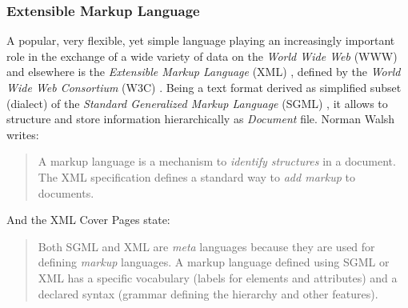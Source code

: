 %
%
%
%
%
%
%

\subsubsection{Extensible Markup Language}
\label{extensible_markup_language_heading}

A popular, very flexible, yet simple language playing an increasingly important
role in the exchange of a wide variety of data on the \emph{World Wide Web}
(WWW) and elsewhere is the \emph{Extensible Markup Language} (XML) \cite{xml},
defined by the \emph{World Wide Web Consortium} (W3C) \cite{w3c}. Being a text
format derived as simplified subset (dialect) of the
\emph{Standard Generalized Markup Language} (SGML) \cite{sgml}, it allows to
structure and store information hierarchically as \emph{Document} file. Norman
Walsh \cite{walsh} writes:

\begin{quote}
    A markup language is a mechanism to \emph{identify structures} in a document.
    The XML specification defines a standard way to \emph{add markup} to documents.
\end{quote}

And the XML Cover Pages \cite{sgmlmetamarkup} state:

\begin{quote}
    Both SGML and XML are \emph{meta} languages because they are used for
    defining \emph{markup} languages. A markup language defined using SGML or
    XML has a specific vocabulary (labels for elements and attributes) and a
    declared syntax (grammar defining the hierarchy and other features).
\end{quote}

